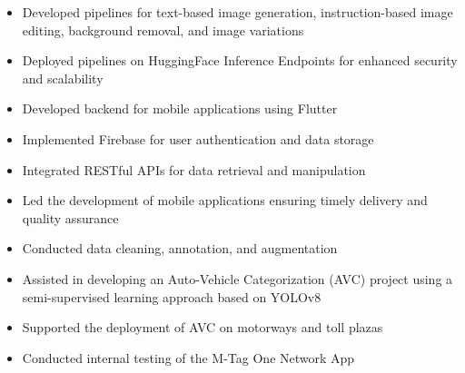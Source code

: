 \documentclass[10pt,a4paper,ragged2e,withhyper]{altacv}
\begin{document}


\makecvheader


\begin{paracol}{2}



\begin{itemize}
\item Developed pipelines for text-based image generation, instruction-based image editing, background removal, and image variations
\item Deployed pipelines on HuggingFace Inference Endpoints for enhanced security and scalability
\end{itemize}

\divider


\begin{itemize}
\item Developed backend for mobile applications using Flutter
\item Implemented Firebase for user authentication and data storage
\item Integrated RESTful APIs for data retrieval and manipulation
\item Led the development of mobile applications ensuring timely delivery and quality assurance
\end{itemize}

\divider


\begin{itemize}
\item Conducted data cleaning, annotation, and augmentation
\item Assisted in developing an Auto-Vehicle Categorization (AVC) project using a semi-supervised learning approach based on YOLOv8
\item Supported the deployment of AVC on motorways and toll plazas
\item Conducted internal testing of the M-Tag One Network App
\end{itemize}


\end{paracol}
\end{document}
